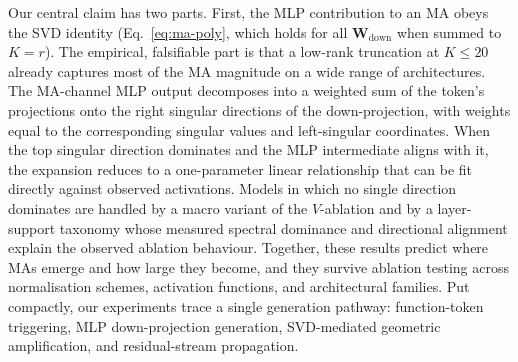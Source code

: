 \documentclass{article}
\newcommand{\Wdown}{\mathbf{W}_{\text{down}}}
\begin{document}
Our central claim has two parts. First, the MLP contribution to an MA
obeys the SVD identity (Eq.~\eqref{eq:ma-poly}, which holds for all
$\Wdown$ when summed to $K=r$). The empirical, falsifiable part is
that a low-rank truncation at $K\leq 20$ already captures most of the
MA magnitude on a wide range of architectures.
The MA-channel MLP output decomposes into a weighted sum of
the token's projections onto the right singular directions of the
down-projection, with weights equal to the corresponding singular values
and left-singular coordinates. When the top singular direction dominates
and the MLP intermediate aligns with it, the expansion reduces to a
one-parameter linear relationship that can be fit directly against
observed activations. Models in which no
single direction dominates are handled by a macro variant of
the $V$-ablation and by a layer-support taxonomy whose measured spectral
dominance and directional alignment explain the observed ablation behaviour.
Together, these results
predict where MAs emerge and how large they become, and
they survive ablation testing across normalisation schemes, activation
functions, and architectural families.
Put compactly, our experiments trace a single generation pathway:
function-token triggering, MLP down-projection generation, SVD-mediated
geometric amplification, and residual-stream propagation.
\end{document}
